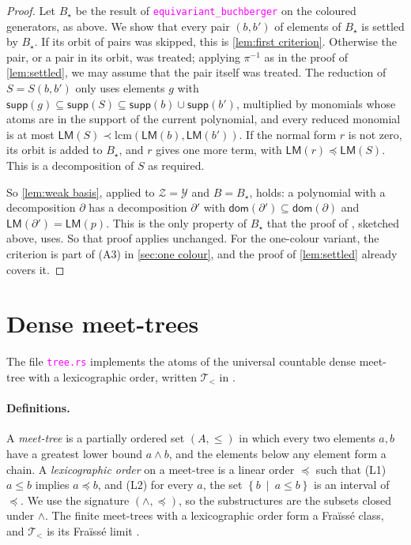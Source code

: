 \documentclass[12pt,a4paper,article]{memoir}
\newcommand{\setof}[2]{\left\{#1\ \mid\ #2 \right\}}
\newcommand{\emphdef}[1]{\emph{\textcolor{BrickRed}{#1}}}
\newcommand{\code}[1]{\texttt{\textcolor{magenta}{#1}}}
\newcommand{\supp}{\mathsf{supp}}
\newcommand{\LM}{\mathsf{LM}}
\theoremstyle{definition}
\begin{document}
\begin{proof}
Let $B_\star$ be the result of \code{equivariant\_buchberger} on the coloured generators, as above.
We show that every pair $(b, b')$ of elements of $B_\star$ is settled by $B_\star$.
If its orbit of pairs was skipped, this is \cref{lem:first criterion}.
Otherwise the pair, or a pair in its orbit, was treated; applying $\pi^{-1}$ as in the proof of \cref{lem:settled},
we may assume that the pair itself was treated.
The reduction of $S = S(b, b')$ only uses elements $g$ with $\supp(g) \subseteq \supp(S) \subseteq \supp(b) \cup \supp(b')$,
multiplied by monomials whose atoms are in the support of the current polynomial,
and every reduced monomial is at most $\LM(S) \prec \mathrm{lcm}(\LM(b), \LM(b'))$.
If the normal form $r$ is not zero, its orbit is added to $B_\star$, and $r$ gives one more term, with $\LM(r) \preceq \LM(S)$.
This is a decomposition of $S$ as required.

So \cref{lem:weak basis}, applied to $\mathcal{Z} = \mathcal{Y}$ and $B = B_\star$, holds:
a polynomial with a decomposition $\partial$ has a decomposition $\partial'$
with $\mathsf{dom}(\partial') \subseteq \mathsf{dom}(\partial)$ and $\LM(\partial') = \LM(p)$.
This is the only property of $B_\star$ that the proof of \cite[Lemma 28]{GL25}, sketched above, uses.
So that proof applies unchanged.
For the one-colour variant, the criterion is part of (A3) in \cref{sec:one colour},
and the proof of \cref{lem:settled} already covers it.
\end{proof}

\section{Dense meet-trees}\label{sec:trees}
%
The file \code{tree.rs} implements the atoms of the universal countable dense meet-tree with a lexicographic order,
written $\mathcal{T}_<$ in \cite[Example 12 and Remark 16]{GL25}.

\paragraph{Definitions.}
A \emphdef{meet-tree} is a partially ordered set $(A, \le)$ in which every two elements $a, b$
have a greatest lower bound $a \wedge b$, and the elements below any element form a chain.
A \emphdef{lexicographic order} on a meet-tree is a linear order $\preceq$ such that
(L1) $a \le b$ implies $a \preceq b$, and
(L2) for every $a$, the set $\setof{b}{a \le b}$ is an interval of $\preceq$.
We use the signature $(\wedge, \preceq)$, so the substructures are the subsets closed under $\wedge$.
The finite meet-trees with a lexicographic order form a Fra\"{i}ss\'{e} class,
and $\mathcal{T}_<$ is its Fra\"{i}ss\'{e} limit \cite[Remark 16]{GL25}.
\end{document}
